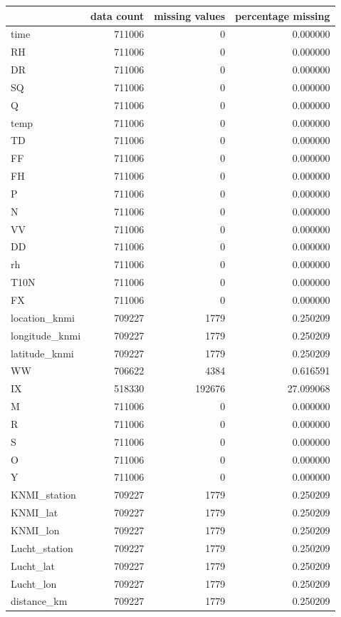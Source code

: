 \begin{tabular}{lrrr}
\toprule
 & data count & missing values & percentage missing \\
\midrule
time & 711006 & 0 & 0.000000 \\
RH & 711006 & 0 & 0.000000 \\
DR & 711006 & 0 & 0.000000 \\
SQ & 711006 & 0 & 0.000000 \\
Q & 711006 & 0 & 0.000000 \\
temp & 711006 & 0 & 0.000000 \\
TD & 711006 & 0 & 0.000000 \\
FF & 711006 & 0 & 0.000000 \\
FH & 711006 & 0 & 0.000000 \\
P & 711006 & 0 & 0.000000 \\
N & 711006 & 0 & 0.000000 \\
VV & 711006 & 0 & 0.000000 \\
DD & 711006 & 0 & 0.000000 \\
rh & 711006 & 0 & 0.000000 \\
T10N & 711006 & 0 & 0.000000 \\
FX & 711006 & 0 & 0.000000 \\
location_knmi & 709227 & 1779 & 0.250209 \\
longitude_knmi & 709227 & 1779 & 0.250209 \\
latitude_knmi & 709227 & 1779 & 0.250209 \\
WW & 706622 & 4384 & 0.616591 \\
IX & 518330 & 192676 & 27.099068 \\
M & 711006 & 0 & 0.000000 \\
R & 711006 & 0 & 0.000000 \\
S & 711006 & 0 & 0.000000 \\
O & 711006 & 0 & 0.000000 \\
Y & 711006 & 0 & 0.000000 \\
KNMI_station & 709227 & 1779 & 0.250209 \\
KNMI_lat & 709227 & 1779 & 0.250209 \\
KNMI_lon & 709227 & 1779 & 0.250209 \\
Lucht_station & 709227 & 1779 & 0.250209 \\
Lucht_lat & 709227 & 1779 & 0.250209 \\
Lucht_lon & 709227 & 1779 & 0.250209 \\
distance_km & 709227 & 1779 & 0.250209 \\

\end{tabular}
